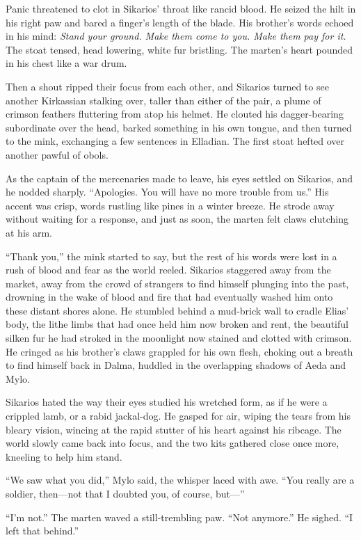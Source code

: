 Panic threatened to clot in Sikarios' throat like rancid blood. He seized the hilt in his right paw and bared a finger's length of the blade. His brother's words echoed in his mind: \emph{Stand your ground. Make them come to you. Make them pay for it.} The stoat tensed, head lowering, white fur bristling. The marten's heart pounded in his chest like a war drum.

Then a shout ripped their focus from each other, and Sikarios turned to see another Kirkassian stalking over, taller than either of the pair, a plume of crimson feathers fluttering from atop his helmet. He clouted his dagger-bearing subordinate over the head, barked something in his own tongue, and then turned to the mink, exchanging a few sentences in Elladian. The first stoat hefted over another pawful of obols.

As the captain of the mercenaries made to leave, his eyes settled on Sikarios, and he nodded sharply. ``Apologies. You will have no more trouble from us.'' His accent was crisp, words rustling like pines in a winter breeze. He strode away without waiting for a response, and just as soon, the marten felt claws clutching at his arm.

``Thank you,'' the mink started to say, but the rest of his words were lost in a rush of blood and fear as the world reeled. Sikarios staggered away from the market, away from the crowd of strangers to find himself plunging into the past, drowning in the wake of blood and fire that had eventually washed him onto these distant shores alone. He stumbled behind a mud-brick wall to cradle Elias' body, the lithe limbs that had once held him now broken and rent, the beautiful silken fur he had stroked in the moonlight now stained and clotted with crimson. He cringed as his brother's claws grappled for his own flesh, choking out a breath to find himself back in Dalma, huddled in the overlapping shadows of Aeda and Mylo.

Sikarios hated the way their eyes studied his wretched form, as if he were a crippled lamb, or a rabid jackal-dog. He gasped for air, wiping the tears from his bleary vision, wincing at the rapid stutter of his heart against his ribcage. The world slowly came back into focus, and the two kits gathered close once more, kneeling to help him stand.

``We saw what you did,'' Mylo said, the whisper laced with awe. ``You really are a soldier, then---not that I doubted you, of course, but---''

``I'm not.'' The marten waved a still-trembling paw. ``Not anymore.'' He sighed. ``I left that behind.''

